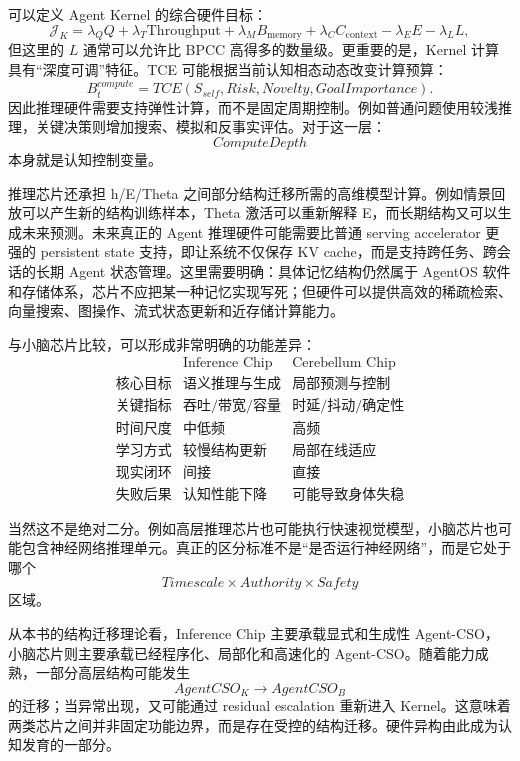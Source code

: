 可以定义 Agent Kernel 的综合硬件目标：
\[
\mathcal J_K
=
\lambda_Q Q
+
\lambda_T \mathrm{Throughput}
+
\lambda_M B_{\mathrm{memory}}
+
\lambda_C C_{\mathrm{context}}
-
\lambda_E E
-
\lambda_L L,
\]
但这里的 $L$ 通常可以允许比 BPCC 高得多的数量级。更重要的是，Kernel 计算具有“深度可调”特征。TCE 可能根据当前认知相态动态改变计算预算：
\[
B_t^{compute}
=
TCE(
S_{self},
Risk,
Novelty,
GoalImportance
).
\]
因此推理硬件需要支持弹性计算，而不是固定周期控制。例如普通问题使用较浅推理，关键决策则增加搜索、模拟和反事实评估。对于这一层：
\[
ComputeDepth
\]
本身就是认知控制变量。

推理芯片还承担 h/E/Theta 之间部分结构迁移所需的高维模型计算。例如情景回放可以产生新的结构训练样本，Theta 激活可以重新解释 E，而长期结构又可以生成未来预测。未来真正的 Agent 推理硬件可能需要比普通 serving accelerator 更强的 persistent state 支持，即让系统不仅保存 KV cache，而是支持跨任务、跨会话的长期 Agent 状态管理。这里需要明确：具体记忆结构仍然属于 AgentOS 软件和存储体系，芯片不应把某一种记忆实现写死；但硬件可以提供高效的稀疏检索、向量搜索、图操作、流式状态更新和近存储计算能力。

与小脑芯片比较，可以形成非常明确的功能差异：
\[
\begin{array}{c|c|c}
 & \text{Inference Chip} & \text{Cerebellum Chip}\\
\hline
\text{核心目标} & \text{语义推理与生成} & \text{局部预测与控制}\\
\text{关键指标} & \text{吞吐/带宽/容量} & \text{时延/抖动/确定性}\\
\text{时间尺度} & \text{中低频} & \text{高频}\\
\text{学习方式} & \text{较慢结构更新} & \text{局部在线适应}\\
\text{现实闭环} & \text{间接} & \text{直接}\\
\text{失败后果} & \text{认知性能下降} & \text{可能导致身体失稳}
\end{array}
\]

当然这不是绝对二分。例如高层推理芯片也可能执行快速视觉模型，小脑芯片也可能包含神经网络推理单元。真正的区分标准不是“是否运行神经网络”，而是它处于哪个
\[
Timescale\times Authority\times Safety
\]
区域。

从本书的结构迁移理论看，Inference Chip 主要承载显式和生成性 Agent-CSO，小脑芯片则主要承载已经程序化、局部化和高速化的 Agent-CSO。随着能力成熟，一部分高层结构可能发生
\[
AgentCSO_K
\rightarrow
AgentCSO_B
\]
的迁移；当异常出现，又可能通过 residual escalation 重新进入 Kernel。这意味着两类芯片之间并非固定功能边界，而是存在受控的结构迁移。硬件异构由此成为认知发育的一部分。

